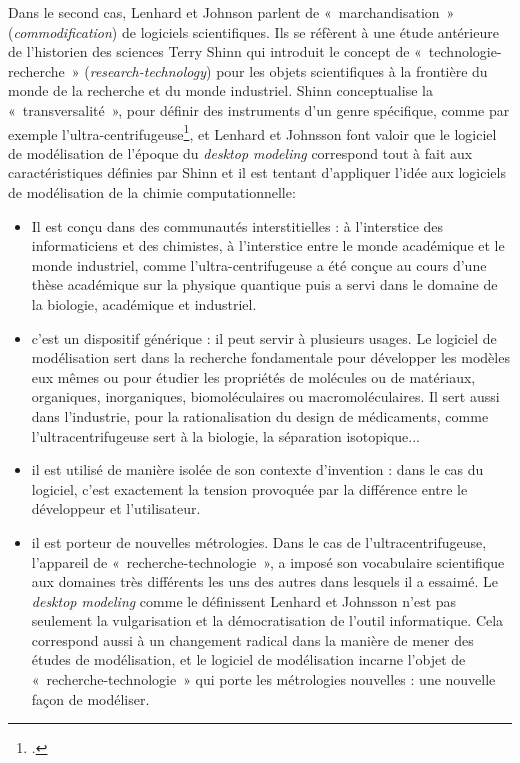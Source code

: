 \documentclass{FramateX}
\begin{document}
\begin{refsection}
Dans le second cas, Lenhard et Johnson parlent de «~marchandisation~»
(\textit{commodification}) de logiciels scientifiques. Ils se réfèrent
à une étude antérieure de l'historien des sciences
Terry Shinn qui introduit le concept de «~technologie-recherche~»
(\textit{research-technology}) pour les objets scientifiques à la
frontière du monde de la recherche et du monde industriel. Shinn
conceptualise la «~transversalité~», pour définir des instruments
d'un genre spécifique, comme par exemple
l'ultra-centrifugeuse\footnote{\cite{Joerges2001}.}, et Lenhard
et Johnsson font valoir que le logiciel de modélisation de
l'époque du \textit{desktop modeling} correspond
tout à fait aux caractéristiques définies par Shinn et il est tentant
d'appliquer l'idée aux logiciels de modélisation de la chimie computationnelle:

\begin{itemize}
\item Il est conçu dans des communautés interstitielles : à
l'interstice des informaticiens et des chimistes, à
l'interstice entre le monde académique et le monde
industriel, comme l'ultra-centrifugeuse a été conçue
au cours d'une thèse académique sur la physique
quantique puis a servi dans le domaine de la biologie, académique et
industriel.
\item c'est un dispositif générique : il peut servir à
plusieurs usages. Le logiciel de modélisation sert dans la recherche
fondamentale pour développer les modèles eux mêmes ou pour étudier les
propriétés de molécules ou de matériaux, organiques, inorganiques,
biomoléculaires ou macromoléculaires. Il sert aussi dans
l'industrie, pour la rationalisation du design de
médicaments, comme l'ultracentrifugeuse sert à la
biologie, la séparation isotopique...
\item il est utilisé de manière isolée de son contexte
d'invention : dans le cas du logiciel,
c'est exactement la tension provoquée par la
différence entre le développeur et l'utilisateur.
\item il est porteur de nouvelles métrologies. Dans le cas de
l'ultracentrifugeuse, l'appareil de
«~recherche-technologie~», a imposé son vocabulaire scientifique aux
domaines très différents les uns des autres dans lesquels il a essaimé.
Le \textit{desktop modeling} comme le définissent Lenhard et
Johnsson n'est pas seulement la vulgarisation et la
démocratisation de l'outil informatique. Cela
correspond aussi à un changement radical dans la manière de mener des
études de modélisation, et le logiciel de modélisation incarne
l'objet de «~recherche-technologie~» qui porte les
métrologies nouvelles : une nouvelle façon de modéliser.
\end{itemize}


\end{refsection}
\end{document}
